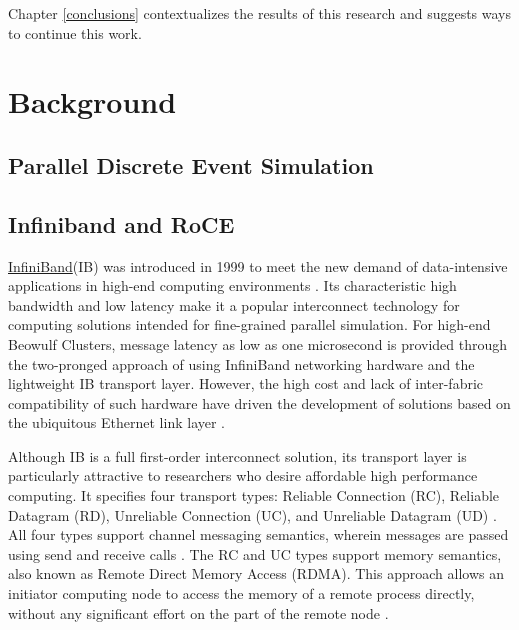 \documentclass[a4paper]{article}
\begin{document}
Chapter \ref{conclusions} contextualizes the results of this research and
suggests ways to continue this work.

\newpage
\section{\textbf{Background}}
\label{background}

\subsection{\textbf{Parallel Discrete Event Simulation}}

\subsection{\textbf{Infiniband and RoCE}}

\href{www.infinibandta.org}{InfiniBand}\texttrademark (IB) was introduced in
1999 to meet the new demand of data-intensive applications in high-end computing
environments \cite{InfiniBandTABase-07}. Its characteristic high bandwidth and
low latency make it a popular interconnect technology for computing solutions
intended for fine-grained parallel simulation. For high-end Beowulf Clusters,
message latency as low as one microsecond is provided through the two-pronged
approach of using InfiniBand networking hardware and the lightweight IB
transport layer. However, the high cost and lack of inter-fabric compatibility
of such hardware have driven the development of solutions based on the
ubiquitous Ethernet link layer \cite{roce-announce}.

Although IB is a full first-order interconnect solution, its transport layer is
particularly attractive to researchers who desire affordable high performance
computing. It specifies four transport types: Reliable Connection (RC), Reliable
Datagram (RD), Unreliable Connection (UC), and Unreliable Datagram (UD)
\cite{InfiniBandTABase-07}. All four types support channel messaging semantics,
wherein messages are passed using send and receive calls
\cite{InfiniBandTABase-07}. The RC and UC types support memory semantics, also
known as Remote Direct Memory Access (RDMA). This approach allows an initiator
computing node to access the memory of a remote process directly, without any
significant effort on the part of the remote node \cite{sur-11}.
\end{document}
